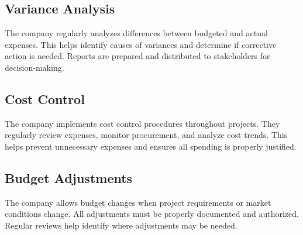 \subsection{Variance Analysis}
The company regularly analyzes differences between budgeted and actual expenses. This helps identify causes of variances and determine if corrective action is needed. Reports are prepared and distributed to stakeholders for decision-making.

\subsection{Cost Control}
The company implements cost control procedures throughout projects. They regularly review expenses, monitor procurement, and analyze cost trends. This helps prevent unnecessary expenses and ensures all spending is properly justified.

\subsection{Budget Adjustments}
The company allows budget changes when project requirements or market conditions change. All adjustments must be properly documented and authorized. Regular reviews help identify where adjustments may be needed.
